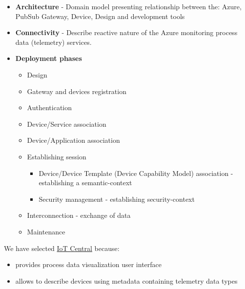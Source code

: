 \documentclass{jacsart}
\providecommand{\tightlist} { \setlength{\itemsep}{0pt}\setlength{\parskip}{0pt}}
\begin{document}
\begin{itemize}
  \tightlist
  \item
        \textbf{Architecture} - Domain model presenting relationship between
        the: Azure, PubSub Gateway, Device, Design and development tools
  \item
        \textbf{Connectivity} - Describe reactive nature of the Azure
        monitoring process data (telemetry) services.
  \item
        \textbf{Deployment phases}

        \begin{itemize}
          \tightlist
          \item
                Design
          \item
                Gateway and devices registration
          \item
                Authentication
          \item
                Device/Service association
          \item
                Device/Application association
          \item
                Establishing session

                \begin{itemize}
                  \tightlist
                  \item
                        Device/Device Template (Device Capability Model) association -
                        establishing a semantic-context
                  \item
                        Security management - establishing security-context
                \end{itemize}
          \item
                Interconnection - exchange of data
          \item
                Maintenance
        \end{itemize}
\end{itemize}

We have selected
\href{https://docs.microsoft.com/azure/iot-central/core/}{IoT Central}
because:

\begin{itemize}
  \tightlist
  \item
        provides process data visualization user interface
  \item
        allows to describe devices using metadata containing telemetry data
        types
\end{itemize}
\end{document}
